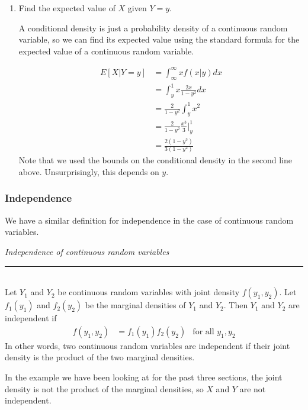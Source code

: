 \documentclass[notes.tex]{subfiles}
\begin{document}
\begin{example}
\begin{enumerate}
\item Find the expected value of $X$ given $Y = y$.

A conditional density is just a probability density of a continuous random variable, so we can find its expected value using the standard formula for the expected value of a continuous random variable.

\begin{align*}
E[X|Y = y] &= \int_{\infty}^{\infty} xf(x|y)dx\\
&= \int_y^1 x \frac{2x}{1 - y^2} dx \\
&= \frac{2}{1 - y^2} \int_y^1 x^2 \\
&= \frac{2}{1 - y^2}\frac{x^3}{3}\Bigr|_y^1 \\
&= \frac{2(1 - y^3)}{3(1 - y^2)}
\end{align*}
Note that we used the bounds on the conditional density in the second line above. Unsurprisingly, this depends on $y$.

\end{enumerate}
\end{example}

\subsubsection{Independence}
We have a similar definition for independence in the case of continuous random variables.\\

\begin{framed}
\emph{Independence of continuous random variables}\\
  \rule{\dimexpr{}\fboxrule}{.1pt} \\
Let $Y_1$ and $Y_2$ be continuous random variables with joint density $f(y_1, y_2)$. Let $f_1(y_1)$ and $f_2(y_2)$ be the marginal densities of $Y_1$ and $Y_2$. Then $Y_1$ and $Y_2$ are independent if
\begin{align*}
f(y_1, y_2) &= f_1(y_1)f_2(y_2) & \text{for all }y_1, y_2
\end{align*}
In other words, two continuous random variables are independent if their joint density is the product of the two marginal densities.
\end{framed}

In the example we have been looking at for the past three sections, the joint density is not the product of the marginal densities, so $X$ and $Y$ are not independent.\\
\end{document}
